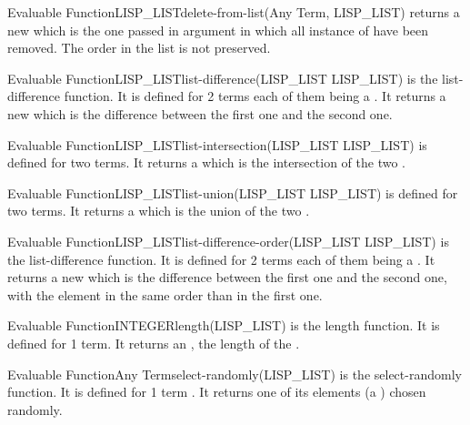 \begin{typeefa}{Evaluable Function}{LISP\_LIST}{delete-from-list}{(Any Term, LISP\_LIST)}
returns a new  which is the one passed in argument in which all
instance of  have been removed. The order in the list is not preserved.
\end{typeefa}

\begin{typeefa}{Evaluable Function}{LISP\_LIST}{list-difference}{(LISP\_LIST
LISP\_LIST)}
is the list-difference function. It is defined for 2 terms each of them
being a . It returns a new  which is the difference
between the first one and the second one.
\end{typeefa}

\begin{typeefa}{Evaluable Function}{LISP\_LIST}{list-intersection}{(LISP\_LIST
LISP\_LIST)} is defined for two  terms. It returns a
 which is the intersection of the two .
\end{typeefa}

\begin{typeefa}{Evaluable Function}{LISP\_LIST}{list-union}{(LISP\_LIST
LISP\_LIST)} is defined for two  terms. It returns a
 which is the union of the two .
\end{typeefa}

\begin{typeefa}{Evaluable Function}{LISP\_LIST}{list-difference-order}{(LISP\_LIST LISP\_LIST)}
is the list-difference function. It is defined for 2 terms each of them
being a . It returns a new  which is the difference
between the first one and the second one, with the element in the same
order than in the first one.
\end{typeefa}

\begin{typeefa}{Evaluable Function}{INTEGER}{length}{(LISP\_LIST)}
is the length function. It is defined for 1 term. It returns an ,
the length of the .
\end{typeefa}

\begin{typeefa}{Evaluable Function}{Any Term}{select-randomly}{(LISP\_LIST)}
is the select-randomly function. It is defined for 1 term . It
returns one of its elements (a ) chosen randomly.
\end{typeefa}

